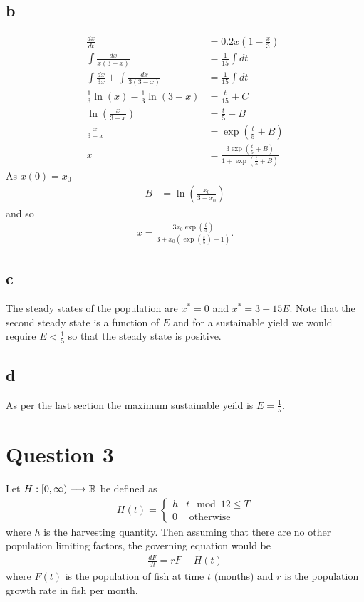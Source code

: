 \documentclass{unswmaths}
\begin{document}
\subsection*{b}
	\begin{align*}
		\frac{dx}{dt} &= 0.2x\left( 1 - \frac{x}{3} \right) \\
		\int \frac{dx}{x(3-x)} &= \frac{1}{15} \int dt \\
		\int \frac{dx}{3x} + \int \frac{dx}{3(3-x)} &= \frac{1}{15} \int dt \\
		\frac{1}{3} \ln(x) - \frac{1}{3} \ln(3-x) &= \frac{t}{15} + C \\
		\ln \left( \frac{x}{3-x} \right) &= \frac{t}{5} + B \\
		\frac{x}{3-x} &= \exp(\frac{t}{5} + B) \\
		x &= \frac{3\exp(\frac{t}{5} + B)}{1 + \exp(\frac{t}{5} + B)}
	\end{align*}
	As $ x(0) = x_0 $
	\begin{align*}
		B &= \ln \left( \frac{x_0}{3-x_0} \right)
	\end{align*}
	and so
	\begin{align*}
		x = \frac{3 x_0 \exp(\frac{t}{5})}{3 + x_0 (\exp(\frac{t}{5}) - 1)}.
	\end{align*}
\subsection*{c}
	The steady states of the population are
	$ x^* = 0 $ and $ x^* = 3 - 15E $. Note that the second steady state is a function of $ E $ and for a sustainable yield we would require $ E < \frac{1}{5} $ so that the steady state is positive.
	
\subsection*{d}
	As per the last section the maximum sustainable yeild is $ E = \frac{1}{5} $.

\section*{Question 3}
Let $ H : [0, \infty) \longrightarrow \mathbb{R} $ be defined as
\begin{align*}
    H(t) = 
    \begin{cases}
        h & t \mod 12 \leq T \\
        0 & \text{ otherwise }
    \end{cases}
\end{align*}
where $ h $ is the harvesting quantity. 
Then assuming that there are no other population limiting factors, the governing equation would be
\begin{align*}
    \frac{dF}{dt} = rF - H(t)
\end{align*}
where $ F(t) $ is the population of fish at time $ t $ (months) and $ r $ is the population growth rate in fish per month.
\end{document}
